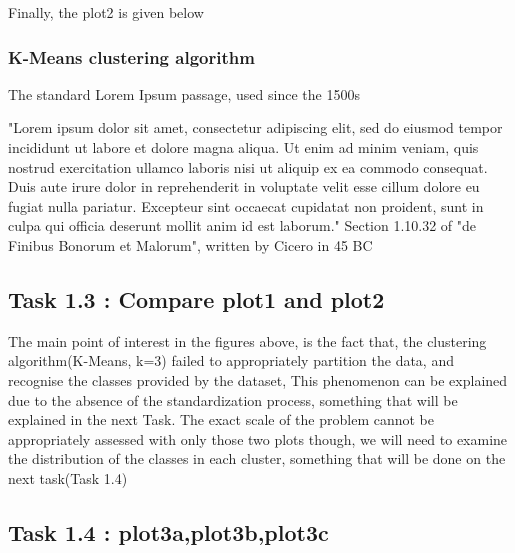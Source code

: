 \documentclass[11pt]{article}
\begin{document}
			Finally, the plot2 is given below

			\subsubsection{K-Means clustering algorithm}
				The standard Lorem Ipsum passage, used since the 1500s
				
				"Lorem ipsum dolor sit amet, consectetur adipiscing elit, sed do eiusmod tempor incididunt ut labore et dolore magna aliqua. Ut enim ad minim veniam, quis nostrud exercitation ullamco laboris nisi ut aliquip ex ea commodo consequat. Duis aute irure dolor in reprehenderit in voluptate velit esse cillum dolore eu fugiat nulla pariatur. Excepteur sint occaecat cupidatat non proident, sunt in culpa qui officia deserunt mollit anim id est laborum."
				Section 1.10.32 of "de Finibus Bonorum et Malorum", written by Cicero in 45 BC
				
				 
		 \subsection*{Task 1.3 : Compare plot1 and plot2}
			The main point of interest in the figures above, is the fact that, the clustering algorithm(K-Means, k=3) failed to appropriately partition the data, and recognise the classes provided by the dataset, This phenomenon can be explained due to the absence of the standardization process, something that will be explained in the next Task. The exact scale of the problem cannot be appropriately assessed with only those two plots though, we will need to examine the distribution of the classes in each cluster, something that will be done on the next task(Task 1.4)
		
		 \subsection*{Task 1.4 : plot3a,plot3b,plot3c}
			
\end{document}
